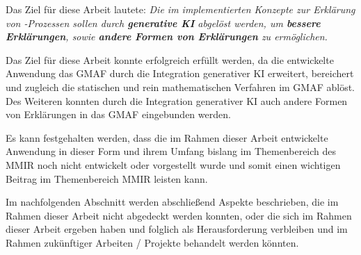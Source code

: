Das Ziel für diese Arbeit lautete: \textit{Die im \gmaf{} implementierten Konzepte zur Erklärung von \mmir{}-Prozessen sollen durch \textbf{generative KI} abgelöst werden, um \textbf{bessere Erklärungen}, sowie \textbf{andere Formen von Erklärungen} zu ermöglichen.}

Das Ziel für diese Arbeit konnte erfolgreich erfüllt werden, da die entwickelte Anwendung das GMAF durch die Integration generativer KI erweitert, bereichert und zugleich die statischen und rein mathematischen Verfahren im GMAF ablöst.
Des Weiteren konnten durch die Integration generativer KI auch andere Formen von Erklärungen in das GMAF eingebunden werden.


Es kann festgehalten werden, dass die im Rahmen dieser Arbeit entwickelte Anwendung in dieser Form und ihrem Umfang bislang im Themenbereich des MMIR noch nicht entwickelt oder vorgestellt wurde und somit einen wichtigen Beitrag im Themenbereich MMIR leisten kann.

Im nachfolgenden Abschnitt werden abschließend Aspekte beschrieben, die im Rahmen dieser Arbeit nicht abgedeckt werden konnten, oder die sich im Rahmen dieser Arbeit ergeben haben und folglich als Herausforderung verbleiben und im Rahmen zukünftiger Arbeiten / Projekte behandelt werden könnten.

